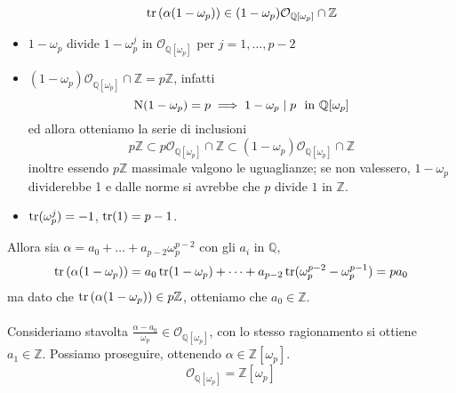 \begin{esempio}
\begin{itemize}
\begin{equation*}
		\operatorname{tr}\left(\alpha(1-\omega_p)\right)\in(1-\omega_p)\mathcal{O}_{\mathbb{Q}[\omega_p]}\cap\mathbb{Z}
		\end{equation*}
		\item $1-\omega_p$ divide $1-\omega_p^j$ in $\mathcal{O}_{\mathbb{Q}[\omega_p]}$ per $j=1,\dots,p-2$
		\item $(1-\omega_p)\mathcal{O}_{\mathbb{Q}[\omega_p]}\cap\mathbb{Z}=p\mathbb{Z}$, infatti
		\begin{equation*}
		\N(1-\omega_p)=p\implies1-\omega_p\mid p \ \ \text{in $\mathbb{Q}[\omega_p]$}
		\end{equation*}
		ed allora otteniamo la serie di inclusioni 
		\begin{equation*}
		p\mathbb{Z}\subset p\mathcal{O}_{\mathbb{Q}[\omega_p]}\cap\mathbb{Z}\subset(1-\omega_p)\mathcal{O}_{\mathbb{Q}[\omega_p]}\cap\mathbb{Z}
		\end{equation*}
		inoltre essendo $p\mathbb{Z}$ massimale valgono le uguaglianze; se non valessero, $1-\omega_p$ dividerebbe 1 e dalle norme si avrebbe che $p$ divide $1$ in $\mathbb{Z}$.
		\item $\operatorname{tr}(\omega_p^j)=-1$, $\operatorname{tr}(1)=p-1$.
	\end{itemize}
	Allora sia $\alpha=a_0+\dots+a_{p-2}\omega_p^{p-2}$ con gli $a_i$ in $\mathbb{Q}$,
	\begin{equation*}
	\operatorname{tr}\left(\alpha(1-\omega_p)\right)=a_0\operatorname{tr}(1-\omega_p)+\dots+a_{p-2}\operatorname{tr}(\omega_p^{p-2}-\omega_p^{p-1})=pa_0
	\end{equation*}
	ma dato che $\operatorname{tr}\left(\alpha(1-\omega_p)\right)\in p\mathbb{Z}$, otteniamo che $a_0\in\mathbb{Z}$. \\ \\ Consideriamo stavolta $\frac{\alpha-a_0}{\omega_p}\in \mathcal{O}_{\mathbb{Q}[\omega_p]}$, con lo stesso ragionamento si ottiene $a_1\in\mathbb{Z}$. Possiamo proseguire, %
	ottenendo $\alpha\in\mathbb{Z}[\omega_p]$.
	\begin{equation*}
	\mathcal{O}_{\mathbb{Q}[\omega_p]}=\mathbb{Z}[\omega_p]
	\end{equation*}
\end{esempio}




